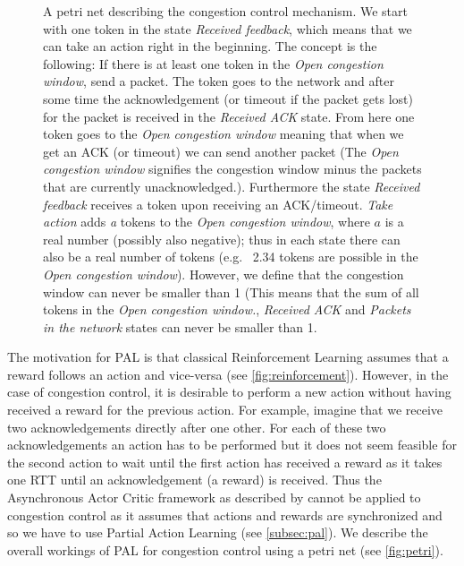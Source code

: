\documentclass[sigconf]{acmart}
\begin{document}
\begin{figure}



\caption{A petri net describing the congestion control mechanism. We start with one token in the state \textit{Received feedback}, which means that we can take an action right in the beginning. The concept is the following: If there is at least one token in the \textit{Open congestion window}, send a packet. The token goes to the network and after some time the acknowledgement (or timeout if the packet gets lost) for the packet is received in the \textit{Received ACK} state. From here one token goes to the \textit{Open congestion window} meaning that when we get an ACK (or timeout) we can send another packet (The \textit{Open congestion window} signifies the congestion window minus the packets that are currently unacknowledged.). Furthermore the state \textit{Received feedback} receives a token upon receiving an ACK/timeout. \textit{Take action} adds \textit{a} tokens to the \textit{Open congestion window}, where $a$ is a real number (possibly also negative); thus in each state there can also be a real number of tokens (e.g.~ 2.34 tokens are possible in the \textit{Open congestion window}). However, we define that the congestion window can never be smaller than 1 (This means that the sum of all tokens in the \textit{Open congestion window.}, \textit{Received ACK} and \textit{Packets in the network} states can never be smaller than 1.}
\label{fig:petri}
\end{figure}

The motivation for PAL is that classical Reinforcement Learning assumes that a reward follows an action and vice-versa (see \autoref{fig:reinforcement}). However, in the case of congestion control, it is desirable to perform a new action without having received a reward for the previous action. For example, imagine that we receive two acknowledgements directly after one other. For each of these two acknowledgements an action has to be performed but it does not seem feasible for the second action to wait until the first action has received a reward as it takes one RTT until an acknowledgement (a reward) is received. Thus the Asynchronous Actor Critic framework as described by \cite{mnih_asynchronous_2016} cannot be applied to congestion control as it assumes that actions and rewards are synchronized and so we have to use Partial Action Learning (see \autoref{subsec:pal}). We describe the overall workings of PAL for congestion control using a petri net (see \autoref{fig:petri}).
\end{document}
